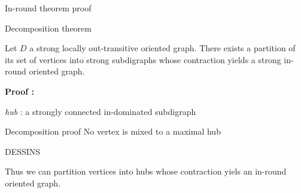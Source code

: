 \documentclass{beamer}
\begin{document}
\begin{frame}{In-round theorem proof}




\end{frame}

\begin{frame}{Decomposition theorem}

\begin{theorem}
Let $D$ a strong locally out-transitive oriented graph. There exists a partition of its set of vertices into strong subdigraphs whose contraction yields a strong in-round oriented graph.
\end{theorem}

\pause

\textbf{Proof :}

\begin{definition}
\emph{hub} : a strongly connected in-dominated subdigraph
\end{definition}

\end{frame}

\begin{frame}{Decomposition proof}
No vertex is mixed to a maximal hub

DESSINS

Thus we can partition vertices into hubs whose contraction yiels an in-round oriented graph.
\end{frame}
\end{document}
